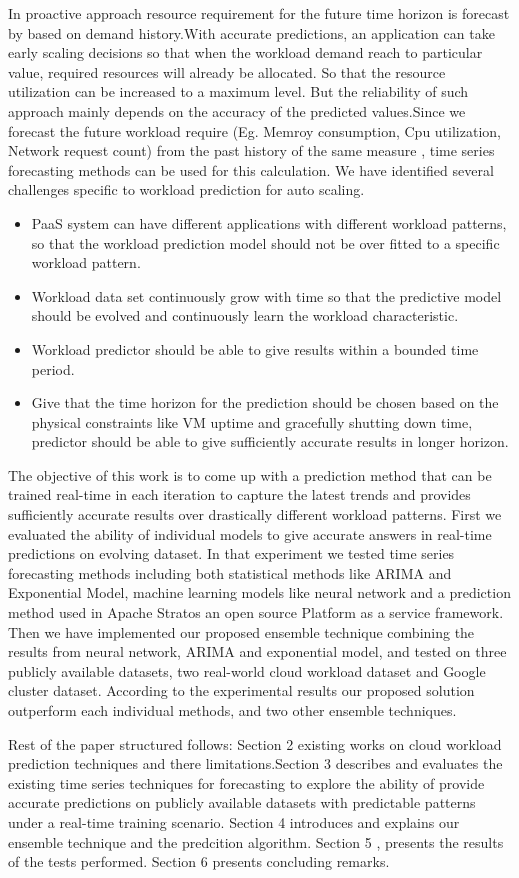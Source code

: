 In proactive approach resource requirement for the future time horizon is forecast by based on demand history.With accurate predictions, an application can take early scaling decisions so that when the workload demand reach to particular value, required resources will already be allocated. So that the resource  utilization can be increased to a maximum level. But the reliability of such approach mainly depends on the accuracy of the predicted values.Since we forecast the future workload require (Eg. Memroy consumption, Cpu utilization, Network request count) from the past history of the same measure , time series forecasting methods can be used for this calculation. 
We have identified several challenges specific to workload prediction for auto scaling.
\begin{itemize}
\item PaaS system can have different applications with different workload patterns, so that the workload prediction model should not be over fitted to a specific workload pattern.
\item Workload data set continuously grow with time so that the predictive model should be evolved and continuously learn the workload characteristic. 
\item Workload predictor should be able to give results within a bounded time period.
\item Give that the  time horizon for the prediction should be chosen based on the physical constraints like VM uptime and gracefully shutting down time, predictor should be able to give sufficiently accurate results in longer horizon.
\end{itemize}

The objective of this work is to come up with a prediction method that can be trained real-time in each iteration to capture the latest trends and provides sufficiently accurate results over drastically different workload patterns. First we evaluated the ability of individual models to give accurate answers in real-time predictions on evolving dataset. In that experiment we tested time series forecasting methods including both statistical methods like ARIMA and Exponential Model, machine learning models like neural network and a prediction method used in Apache Stratos an open source Platform as a service framework. Then we have implemented our proposed ensemble technique combining the results from neural network, ARIMA and exponential model, and tested on three publicly available datasets, two real-world cloud workload dataset and Google cluster dataset. According to the experimental results our proposed solution outperform each individual methods, and two other ensemble techniques.

Rest of the paper structured follows: Section 2 existing works on cloud workload prediction techniques and there limitations.Section 3 describes and evaluates the existing time series techniques for forecasting to explore the ability of provide  accurate predictions on publicly available datasets with predictable patterns under a real-time training scenario. Section 4 introduces and explains our ensemble technique and  the predcition algorithm. Section 5 , presents the results of the tests performed. Section 6 presents concluding remarks.
